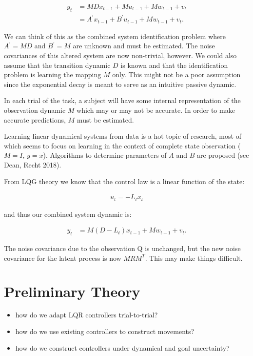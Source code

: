 \documentclass[
  a4paper,
]{article}
\providecommand{\tightlist}{%
  \setlength{\itemsep}{0pt}\setlength{\parskip}{0pt}}
\begin{document}
\begin{align*}
y_t &= MDx_{t-1} + Mu_{t-1} + Mw_{t-1} + v_t \\
&= A^\prime x_{t-1} + B^\prime u_{t-1} + Mw_{t-1} + v_t.
\end{align*}

We can think of this as the combined system identification problem where
\(A^\prime=MD\) and \(B^\prime=M\) are unknown and must be estimated.
The noise covariances of this altered system are now non-trivial,
however. We could also assume that the transition dynamic \(D\) is known
and that the identification problem is learning the mapping \(M\) only.
This might not be a poor assumption since the exponential decay is meant
to serve as an intuitive passive dynamic.

In each trial of the task, a subject will have some internal
representation of the observation dynamic \(M\) which may or may not be
accurate. In order to make accurate predictions, \(M\) must be
estimated.

Learning linear dynamical systems from data is a hot topic of research,
most of which seems to focus on learning in the context of complete
state observation (\(M=I\), \(y=x\)). Algorithms to determine parameters
of \(A\) and \(B\) are proposed (see Dean, Recht 2018).

From LQG theory we know that the control law is a linear function of the
state:

\begin{align*}
u_t = -L_tx_t
\end{align*}

and thus our combined system dynamic is:

\begin{align*}
y_t &= M(D-L_t)x_{t-1} + Mw_{t-1} + v_t.
\end{align*}

The noise covariance due to the observation Q is unchanged, but the new
noise covariance for the latent process is now \(MRM^T\). This may make
things difficult.

\hypertarget{sec:bg_experiment}{%
\section{Preliminary Theory}\label{sec:bg_experiment}}

\begin{itemize}
\tightlist
\item
  how do we adapt LQR controllers trial-to-trial?
\item
  how do we use existing controllers to construct movements?
\item
  how do we construct controllers under dynamical and goal uncertainty?
\end{itemize}
\end{document}

